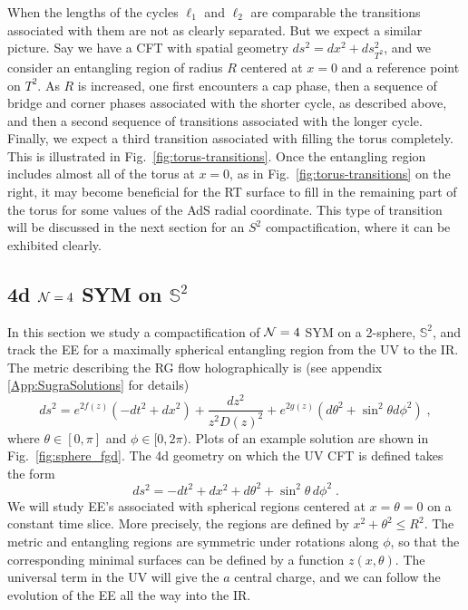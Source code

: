 \documentclass[11 pt]{article}
\begin{document}
When the lengths of the cycles $\ell_1$ and $\ell_2$ are comparable the transitions associated with them are not as clearly separated. But we expect a similar picture. Say we have a CFT with spatial geometry $ds^2=dx^2+ds^2_{T^2}$, and we consider an entangling region of radius $R$ centered at $x=0$ and a reference point on $T^2$. As $R$ is increased, one first encounters a cap phase, then a sequence of bridge and corner phases associated with the shorter cycle, as described above, and then a second sequence of transitions associated with the longer cycle. Finally, we expect a third transition associated with filling the torus completely. This is illustrated in Fig.~\ref{fig:torus-transitions}. Once the entangling region includes almost all of the torus at $x=0$, as in Fig.~\ref{fig:torus-transitions} on the right, it may become beneficial for the RT surface to fill in the remaining part of the torus for some values of the AdS radial coordinate. This type of transition will be discussed in the next section for an $S^2$ compactification, where it can be exhibited clearly.



\subsection{4d  ${\cal N}=4$ SYM on $\mathbb{S}^2$} \label{N=4}

In this section we study a  compactification of ${\cal N}=4$ SYM on a 2-sphere, $\mathbb{S}^2$, and track the EE for a maximally spherical entangling region from the UV to the IR. The metric describing the RG flow holographically is (see appendix \ref{App:SugraSolutions} for details)
\begin{equation}\label{sphere metric main}
    ds^2=e^{2f(z)}(-dt^2+dx^2) + \frac{dz^2}{z^2 D(z)^2} + e^{2g(z)}(d\theta^2+\sin^2\theta d\phi^2)\;,
\end{equation}
where $\theta\in[0,\pi]$ and $\phi\in[0,2\pi)$. 
Plots of an example solution are shown in Fig.~\ref{fig:sphere_fgd}.
The 4d geometry on which the UV CFT is defined takes the form 
\begin{equation}
    ds^2=-dt^2+dx^2 + d\theta^2+\sin^2\!\theta\, d\phi^2\;.
\end{equation}
We will study EE's associated with spherical regions centered at $x=\theta=0$ on a constant time slice. More precisely, the regions are defined by $x^2+\theta^2\leq R^2$.
The metric and entangling regions are symmetric under rotations along $\phi$, so that the corresponding minimal surfaces can be defined by a function $z(x,\theta)$. The universal term in the UV will give the $a$ central charge, and we can follow the evolution of the EE all the way into the IR.
\end{document}
